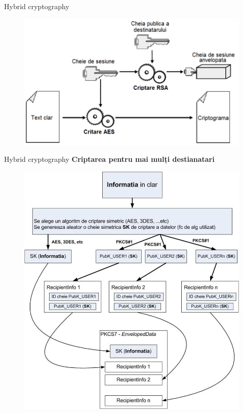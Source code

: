 \documentclass[pdf]{beamer}
\begin{document}
\begin{frame}{Hybrid cryptography}
\begin{figure}[t]
\centering
\includegraphics[scale=0.65]{Images/hybrid}
\end{figure}
\end{frame}



\begin{frame}{Hybrid cryptography}
\textbf{Criptarea pentru mai mulți destianatari}
\begin{figure}[t]
\centering
\includegraphics[scale=0.49]{Images/hybridm}
\end{figure}
\end{frame}
\end{document}
